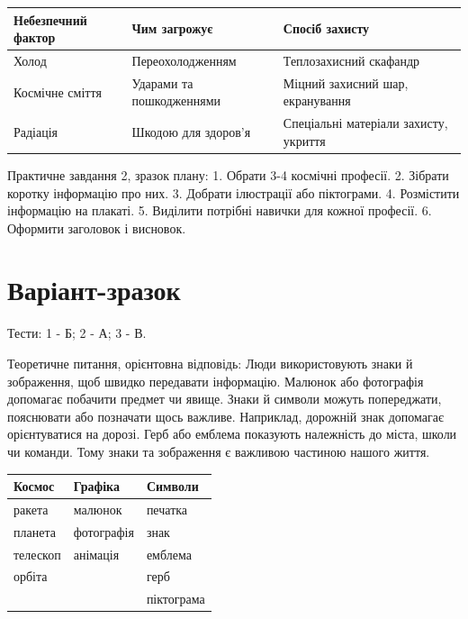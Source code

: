 \documentclass[11pt,a4paper]{article}
\begin{document}
\begin{tabularx}{\linewidth}{|>{\raggedright\arraybackslash}X|>{\raggedright\arraybackslash}X|>{\raggedright\arraybackslash}X|}\hline

\textbf{Небезпечний фактор} & \textbf{Чим загрожує} & \textbf{Спосіб захисту} \\ \hline

Холод & Переохолодженням & Теплозахисний скафандр \\ \hline

Космічне сміття & Ударами та пошкодженнями & Міцний захисний шар, екранування \\ \hline

Радіація & Шкодою для здоров'я & Спеціальні матеріали захисту, укриття \\ \hline

\end{tabularx}\par

Практичне завдання 2, зразок плану: 1. Обрати 3-4 космічні професії. 2. Зібрати коротку інформацію про них. 3. Добрати ілюстрації або піктограми. 4. Розмістити інформацію на плакаті. 5. Виділити потрібні навички для кожної професії. 6. Оформити заголовок і висновок.\par

\newpage

\section*{Варіант-зразок}

Тести: 1 - Б; 2 - А; 3 - В.\par

Теоретичне питання, орієнтовна відповідь: Люди використовують знаки й зображення, щоб швидко передавати інформацію. Малюнок або фотографія допомагає побачити предмет чи явище. Знаки й символи можуть попереджати, пояснювати або позначати щось важливе. Наприклад, дорожній знак допомагає орієнтуватися на дорозі. Герб або емблема показують належність до міста, школи чи команди. Тому знаки та зображення є важливою частиною нашого життя.\par

\begin{tabularx}{\linewidth}{|>{\raggedright\arraybackslash}X|>{\raggedright\arraybackslash}X|>{\raggedright\arraybackslash}X|}\hline

\textbf{Космос} & \textbf{Графіка} & \textbf{Символи} \\ \hline

ракета & малюнок & печатка \\ \hline

планета & фотографія & знак \\ \hline

телескоп & анімація & емблема \\ \hline

орбіта &  & герб \\ \hline

 &  & піктограма \\ \hline

\end{tabularx}\par
\end{document}
